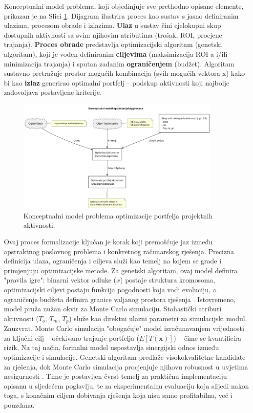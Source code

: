 Konceptualni model problema, koji objedinjuje sve prethodno opisane elemente, prikazan je na Slici \ref{fig:konceptualni_model}. Dijagram ilustrira proces kao sustav s jasno definiranim ulazima, procesom obrade i izlazima. \textbf{Ulaz} u sustav čini cjelokupni skup dostupnih aktivnosti sa svim njihovim atributima (trošak, ROI, procjene trajanja). \textbf{Proces obrade} predstavlja optimizacijski algoritam (genetski algoritam), koji je vođen definiranim \textbf{ciljevima} (maksimizacija ROI-a i/ili minimizacija trajanja) i sputan zadanim \textbf{ograničenjem} (budžet). Algoritam sustavno pretražuje prostor mogućih kombinacija (svih mogućih vektora x) kako bi kao \textbf{izlaz} generirao optimalni portfelj – podskup aktivnosti koji najbolje zadovoljava postavljene kriterije.
\begin{figure}[H]
    \centering
    \includegraphics[width=0.9\textwidth]{slike/model_problema.png}
    \caption{Konceptualni model problema optimizacije portfelja projektnih aktivnosti.}
    \label{fig:konceptualni_model}
\end{figure}
Ovaj proces formalizacije ključan je korak koji premošćuje jaz između apstraktnog poslovnog problema i konkretnog računarskog rješenja. Precizna definicija ulaza, ograničenja i ciljeva služi kao temelj na kojem se grade i primjenjuju optimizacijske metode. Za genetski algoritam, ovaj model definira "pravila igre": binarni vektor odluke ($x$) postaje struktura kromosoma, optimizacijski ciljevi postaju funkcija pogodnosti koja vodi evoluciju, a ograničenje budžeta definira granice valjanog prostora rješenja \cite{Mitchell1998}.
Istovremeno, model pruža nužan okvir za Monte Carlo simulaciju. Stohastički atributi aktivnosti ($T_o$, $T_m$, $T_p$) služe kao direktni ulazni parametri za simulacijski modul. Zauzvrat, Monte Carlo simulacija "obogaćuje" model izračunavanjem vrijednosti za ključni cilj – očekivano trajanje portfelja ($E[T(\mathbf{x})]$) – čime se kvantificira rizik.
Na taj način, formalni model uspostavlja sinergijski odnos između optimizacije i simulacije. Genetski algoritam predlaže visokokvalitetne kandidate za rješenja, dok Monte Carlo simulacija procjenjuje njihovu robusnost u uvjetima nesigurnosti \cite{Rubinstein2016}. Time je postavljen čvrst temelj za praktičnu implementaciju opisanu u sljedećem poglavlju, te za eksperimentalnu evaluaciju koja slijedi nakon toga, s konačnim ciljem dobivanja rješenja koja nisu samo profitabilna, već i pouzdana.
